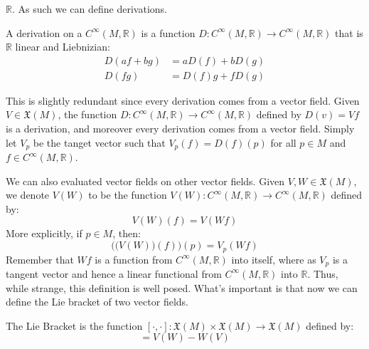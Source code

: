         $\mathbb{R}$. As such we can define derivations.
        \begin{definition}
            A derivation on a $C^{\infty}(M,\mathbb{R})$ is a function
            $D:C^{\infty}(M,\mathbb{R})\rightarrow{C}^{\infty}(M,\mathbb{R})$
            that is $\mathbb{R}$ linear and Liebnizian:
            \begin{align}
                D(af+bg)&=aD(f)+bD(g)\\
                D(fg)&=D(f)g+fD(g)
            \end{align}
        \end{definition}
        This is slightly redundant since every derivation comes from a vector
        field. Given $V\in\mathfrak{X}(M)$, the function
        $D:C^{\infty}(M,\mathbb{R})\rightarrow{C}^{\infty}(M,\mathbb{R})$
        defined by $D(v)=Vf$ is a derivation, and moreover every derivation
        comes from a vector field. Simply let $V_{p}$ be the tanget vector such
        that $V_{p}(f)=D(f)(p)$ for all $p\in{M}$ and
        $f\in{C}^{\infty}(M,\mathbb{R})$. 
        \par\hfill\par
        We can also evaluated vector fields on other vector fields. Given
        $V,W\in\mathfrak{X}(M)$, we denote $V(W)$ to be the function
        $V(W):C^{\infty}(M,\mathbb{R})\rightarrow{C}^{\infty}(M,\mathbb{R})$
        defined by:
        \begin{equation}
            V(W)(f)=V(Wf)
        \end{equation}
        More explicitly, if $p\in{M}$, then:
        \begin{equation}
            \Big(\big(V(W)\big)(f)\Big)(p)=V_{p}(Wf)
        \end{equation}
        Remember that $Wf$ is a function from $C^{\infty}(M,\mathbb{R})$ into
        itself, where as $V_{p}$ is a tangent vector and hence a linear
        functional from $C^{\infty}(M,\mathbb{R})$ into $\mathbb{R}$. Thus,
        while strange, this definition is well posed. What's important is that
        now we can define the Lie bracket of two vector fields.
        \begin{definition}
            The Lie Bracket is the function
            $[\cdot,\cdot]:\mathfrak{X}(M)\times\mathfrak{X}(M)%
             \rightarrow\mathfrak{X}(M)$ defined by:
            \begin{equation}
                [V,W]=V(W)-W(V)
            \end{equation}
        \end{definition}
